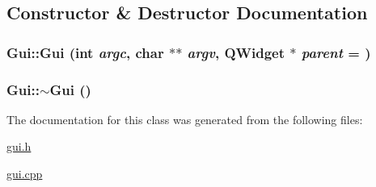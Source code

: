 \subsection{Constructor \& Destructor Documentation}
\hypertarget{classGui_a797b7ddfe4c19abb19a37255de3eaefe}{
\subsubsection[{Gui}]{\setlength{\rightskip}{0pt plus 5cm}Gui::Gui (int {\em argc}, \/  char $\ast$$\ast$ {\em argv}, \/  QWidget $\ast$ {\em parent} = {})}}
\label{classGui_a797b7ddfe4c19abb19a37255de3eaefe}
\hypertarget{classGui_a4fd8485d226f9b8a2ac2d81d7f0f3598}{
\subsubsection[{$\sim$Gui}]{\setlength{\rightskip}{0pt plus 5cm}Gui::$\sim$Gui ()}}
\label{classGui_a4fd8485d226f9b8a2ac2d81d7f0f3598}


The documentation for this class was generated from the following files:\begin{DoxyCompactItemize}
\item 
\hyperlink{gui_8h}{gui.h}\item 
\hyperlink{gui_8cpp}{gui.cpp}\end{DoxyCompactItemize}
